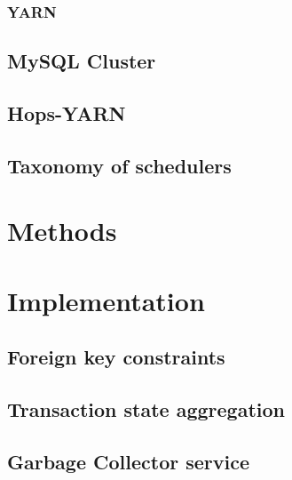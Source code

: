 \documentclass[12pt,a4paper,twoside,openright]{book}
\begin{document}
\subsection{YARN}
\label{ssec:yarn}


\section{MySQL Cluster}
\label{sec:ndb}


\section{Hops-YARN}
\label{sec:hopsyarn}


\section{Taxonomy of schedulers}
\label{sec:taxonomy_of_schedulers}


\chapter{Methods}
\label{chap:methods}


\chapter{Implementation}
\label{chap:implementation}


\section{Foreign key constraints}
\label{sec:fk_constraints}


\section{Transaction state aggregation}
\label{sec:tx_aggregation}


\section{Garbage Collector service}
\label{sec:gc_service}

\end{document}
